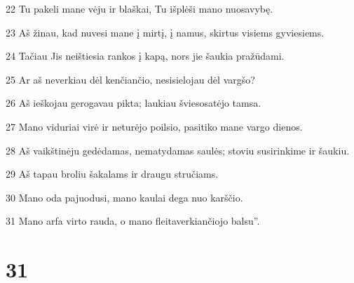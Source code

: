 \par 22 Tu pakeli mane vėju ir blaškai, Tu išplėši mano nuosavybę. 
\par 23 Aš žinau, kad nuvesi mane į mirtį, į namus, skirtus visiems gyviesiems. 
\par 24 Tačiau Jis neištiesia rankos į kapą, nors jie šaukia pražūdami. 
\par 25 Ar aš neverkiau dėl kenčiančio, nesisielojau dėl vargšo? 
\par 26 Aš ieškojau gero­gavau pikta; laukiau šviesos­atėjo tamsa. 
\par 27 Mano viduriai virė ir neturėjo poilsio, pasitiko mane vargo dienos. 
\par 28 Aš vaikštinėju gedėdamas, nematydamas saulės; stoviu susirinkime ir šaukiu. 
\par 29 Aš tapau broliu šakalams ir draugu stručiams. 
\par 30 Mano oda pajuodusi, mano kaulai dega nuo karščio. 
\par 31 Mano arfa virto rauda, o mano fleita­verkiančiojo balsu”.



\chapter{31}


